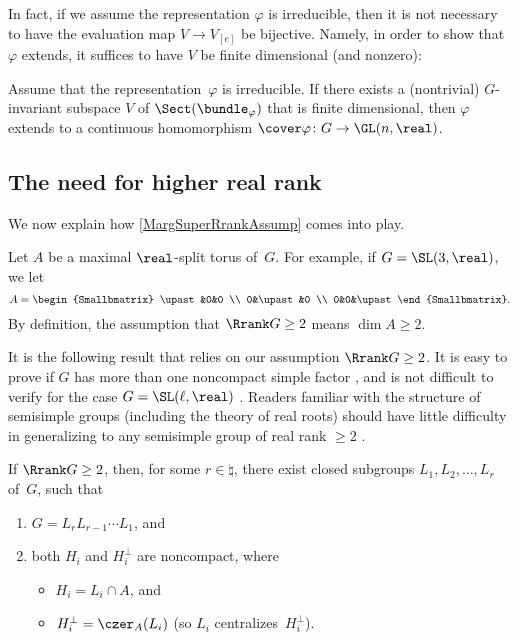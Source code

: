 In fact, if we assume the representation $\varphi$ is irreducible, then it is not necessary to have the evaluation map $V \to V_{[e]}$ be bijective. Namely, in order to show that $\varphi$ extends, it suffices to have $V$ be finite dimensional (and nonzero):

\begin{lem} \label{Extend<>FD}
Assume that the representation~$\varphi$ is irreducible. If there exists a\/ \textup(nontrivial\/\textup) $G$-invariant subspace $V$ of\/ $\Sect(\bundle_\varphi)$ that is finite dimensional,
then $\varphi$ extends to a continuous homomorphism $\cover\varphi \colon G \to \GL(n,\real)$.
\end{lem}


\subsection{The need for higher real rank}

We now explain how \cref{MargSuperRrankAssump} comes into play. 

\begin{notation}
Let $A$ be a maximal $\real$-split torus of~$G$. For example, if $G = \SL(3,\real)$, we let
	$$ A = \begin{Smallbmatrix} \upast&0&0 \\ 0&\upast&0 \\ 0&0&\upast \end{Smallbmatrix} .$$
By definition, the assumption that $\Rrank G \ge 2$ means $\dim A \ge 2$.
\end{notation}

It is the following result that relies on our assumption $\Rrank G \ge 2$. It is easy to prove if $G$ has more than one noncompact simple factor , and is not difficult to verify for the case $G = \SL(\ell,\real)$ .  Readers familiar with the structure of semisimple groups (including the theory of real roots) should have little difficulty in generalizing to any semisimple group of real rank $\ge 2$ .

\begin{lem} \label{HighRankGenLi}
If\/ $\Rrank G \ge 2$, then, for some $r \in \natural$, there exist closed subgroups $L_1,L_2,\ldots,L_r$ of~$G$, such that
	\begin{enumerate}
	\item $ G = L_r L_{r-1} \cdots L_1$,
	and
	\item both $H_i$ and $H_i^\perp$ are noncompact, where
		\begin{itemize}
		\item $H_i = L_i \cap A$,
		and
		\item $H_i^\perp = \czer_A(L_i)$ {\rm(}so $L_i$ centralizes~$H_i^\perp${\rm)}.
		\end{itemize}
	\end{enumerate}
\end{lem}


